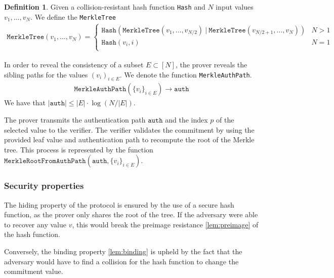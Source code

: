 \documentclass[11pt]{report}
\theoremstyle{definition}
\newtheorem{definition}{Definition}[section]
\theoremstyle{plain}
\begin{document}
\begin{definition}\label{def:merkle_tree}
  Given a collision-resistant hash function \texttt{Hash} and $N$ input values $v_1, \dots, v_N$. We define the \texttt{MerkleTree}
  {\small\begin{align*}
      \texttt{MerkleTree}(v_1, \dots, v_N) = \begin{cases}
                                               \texttt{Hash}(\texttt{MerkleTree}(v_1, \dots, v_{N/2})\ |\ \texttt{MerkleTree}(v_{N/2+1}, \dots, v_N)) & N > 1 \\
                                               \texttt{Hash}(v_i, i)                                                                                  & N = 1 \\
                                             \end{cases}
    \end{align*}}%
\end{definition}

In order to reveal the consistency of a subset $E \subset [N]$, the prover reveals the sibling paths for the values $(v_i)_{i \in E}$. We denote the function \texttt{MerkleAuthPath}.
\begin{align*}
  \texttt{MerkleAuthPath}(\{v_i\}_{i \in E}) \rightarrow \texttt{auth}
\end{align*}
We have that $|\texttt{auth}| \leq |E| \cdot \log(N/|E|)$.

The prover transmits the authentication path $\texttt{auth}$ and the index $p$ of the selected value to the verifier. The verifier validates the commitment by using the provided leaf value and authentication path to recompute the root of the Merkle tree. This process is represented by the function $\texttt{MerkleRootFromAuthPath}(\texttt{auth}, \{v_i\}_{i \in E})$.

\subsubsection{Security properties}

The hiding property of the protocol is ensured by the use of a secure hash function, as the prover only shares the root of the tree. If the adversary were able to recover any value $v$, this would break the preimage resistance \autoref{lem:preimage} of the hash function.

Conversely, the binding property \autoref{lem:binding} is upheld by the fact that the adversary would have to find a collision for the hash function to change the commitment value.
\end{document}
